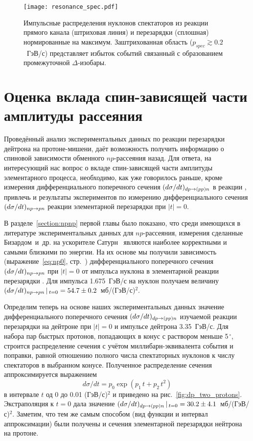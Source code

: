 \begin{figure}[h]
  \centering
  \texttt{[image: resonance\_spec.pdf]}
  \caption{Импульсные распределения нуклонов спектаторов из реакции прямого
    канала (штриховая линия) и перезарядки (сплошная) нормированные на максимум.
    Заштрихованная область ($p_{spec} \gtrsim 0.2$~ГэВ/с) представляет избыток
    событий связанный с образованием промежуточной $\Delta$-изобары.}
  \label{fig:resonance_spec}
\end{figure}

\section{Оценка вклада спин-зависящей части амплитуды
  \maybebm{{\np}} рассеяния}
Проведённый анализ экспериментальных данных по реакции перезарядки дейтрона на
протоне-мишени, даёт возможность получить информацию о спиновой зависимости
обменного $np$-рассеяния назад. Для ответа, на интересующий нас вопрос о вкладе
спин-зависящей части амплитуды элементарного \np процесса, необходимо, как уже
говорилось раньше, кроме измерения дифференциального поперечного сечения
$(d\sigma/dt)_{dp \rightarrow (pp)n}$ в реакции \dpchex, привлечь и результаты экспериментов
по измерению дифференциального сечения $(d\sigma/dt)_{np \rightarrow pn}$ реакции элементарной
перезарядки \np при $|t|=0$.

В разделе~\ref{section:npnp} первой главы было показано, что среди имеющихся в
литературе экспериментальных данных для $np$-рассеяния, измерения сделанные
Бизардом~и~др. на ускорителе Сатурн~\cite{biz75} являются наиболее корректными и
самыми близкими по энергии. На их основе мы получили зависимость
(выражение~\eqref{eq:np0}, стр.~\pageref{eq:np0}) дифференциального поперечного
сечения $(d\sigma/dt)_{np \rightarrow pn}$ при $|t|=0$ от импульса нуклона в элементарной
реакции перезарядки \np. Для импульса 1.675~ГэВ/с на нуклон получаем
величину $(d\sigma/dt)_{np \rightarrow pn}\,|\,_{t=0} = 54.7 \pm 0.2$~мб/(ГэВ/с)$^{2}$.

Определим теперь на основе наших экспериментальных данных значение
дифференциального поперечного сечения $(d\sigma/dt)_{dp \rightarrow (pp)n}$ изучаемой реакции
перезарядки на дейтроне \dpchex при $|t|=0$ и импульсе дейтрона 3.35~ГэВ/с. Для
набора пар быстрых протонов, попадающих в конус с раствором меньше
5$^{\,\circ}$, строится распределение сечения с учётом миллибарн-эквивалента
события и поправки, равной отношению полного числа спектаторных нуклонов к числу
спектаторов в выбранном конусе. Полученное распределение сечения
аппроксимируется выражением
\begin{equation}
  \label{eq:exdp}
  d\sigma/dt = p_0\exp(p_1\,t + p_2\,t^2)
\end{equation}
в интервале $t$ од 0 до 0.01 (ГэВ/с)$^2$ и приведено на
рис.~\ref{fig:dp_two_protons}. Экстраполяция к $t=0$ дала значение
$(d\sigma/dt)_{dp \rightarrow (pp)n}\,|\,_{t=0} = 30.2 \pm 4.1$~мб/(ГэВ/с)$^{2}$. Заметим,
что тем же самым способом (вид функции и интервал аппроксимации) были получены
и сечения элементарной перезарядки нейтрона на протоне.

